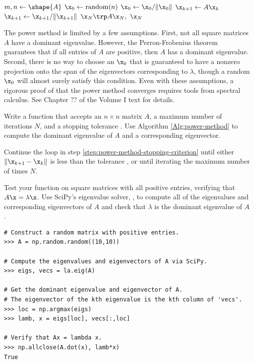 \begin{algorithm}[H] %
\begin{algorithmic}[1]
    \State $m, n \gets \shape{A}$
    \State $\x_0 \gets \text{random}(n)$
    \State $\x_0 \gets \x_0/\|\x_0\|$
        \label{step:power-method-stopping-criterion}
        \State $\x_{k+1} \gets A\x_k$
        \State $\x_{k+1} \gets \x_{k+1}/\|\x_{k+1}\|$
    \EndFor
    \State {} $\x_N\trp A \x_N,\ \x_N$
\EndProcedure
\end{algorithmic}
\caption{}
\label{Alg:power-method}
\end{algorithm}

The power method is limited by a few assumptions.
First, not all square matrices $A$ have a dominant eigenvalue.
However, the Perron-Frobenius theorem%
guarantees that if all entries of $A$ are positive, then $A$ has a dominant eigenvalue.
Second, there is no way to choose an $\x_0$ that is guaranteed to have a nonzero projection onto the span of the eigenvectors corresponding to $\lambda$, though a random $\x_0$ will almost surely satisfy this condition.
Even with these assumptions, a rigorous proof of that the power method converges requires tools from spectral calculus.
See Chapter ?? of the Volume I text for details. %

\begin{problem} %
Write a function that accepts an $n \times n$ matrix $A$, a maximum number of iterations $N$, and a stopping tolerance .
Use Algorithm \ref{Alg:power-method} to compute the dominant eigenvalue of $A$ and a corresponding eigenvector.

Continue the loop in step \ref{step:power-method-stopping-criterion} until either $\|\x_{k+1} - \x_k\|$ is less than the tolerance , or until iterating the maximum number of times $N$.

Test your function on square matrices with all positive entries, verifying that $A\x = \lambda\x$.
Use SciPy's eigenvalue solver, , to compute all of the eigenvalues and corresponding eigenvectors of $A$ and check that $\lambda$ is the dominant eigenvalue of $A$.

\begin{lstlisting}
# Construct a random matrix with positive entries.
>>> A = np.random.random((10,10))

# Compute the eigenvalues and eigenvectors of A via SciPy.
>>> eigs, vecs = la.eig(A)

# Get the dominant eigenvalue and eigenvector of A.
# The eigenvector of the kth eigenvalue is the kth column of 'vecs'.
>>> loc = np.argmax(eigs)
>>> lamb, x = eigs[loc], vecs[:,loc]

# Verify that Ax = lambda x.
>>> np.allclose(A.dot(x), lamb*x)
True
\end{lstlisting}
\end{problem}

